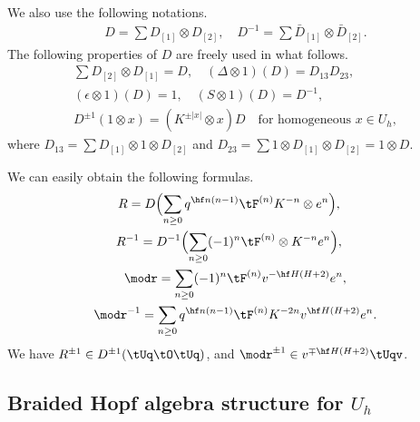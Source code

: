 \documentclass{amsart}
\numberwithin{equation}{section}
\numberwithin{figure}{section}
\theoremstyle{plain}
\theoremstyle{definition}
\theoremstyle{remark}
\begin{document}
We also use the following notations.
\begin{gather*}
  D = \sum D_{[1]}\otimes D_{[2]},\quad
  D^{-1} = \sum \bar D_{[1]}\otimes \bar D_{[2]}.
\end{gather*}
The following properties of $D$ are freely used in what follows.
\begin{gather}
  \sum D_{[2]}\otimes D_{[1]}=D,\quad
  (\Delta \otimes 1)(D)=D_{13}D_{23},\\
  (\epsilon \otimes 1)(D)=1,\quad
  (S\otimes 1)(D)=D^{-1},\\
  \label{e31}
  D^{\pm 1}(1\otimes x)=(K^{\pm |x|}\otimes x)D\quad \text{for homogeneous $x\in U_h$},
\end{gather}
where $D_{13}=\sum D_{[1]}\otimes 1\otimes D_{[2]}$ and
$D_{23}=\sum1\otimes D_{[1]}\otimes D_{[2]}=1\otimes D$.

We can easily obtain the following formulas.
\begin{gather}
  \label{eq:11}
  \begin{split}
  R
  &=D\Bigl(\sum_{n\ge 0} q^{\hf n(n-1)}\tF^{(n)}K^{-n}\otimes e^n\Bigr),
  \end{split}\\
  \label{e30}
  \begin{split}
    R^{-1}
    &=D^{-1}\Bigl(\sum_{n\ge 0} (-1)^n\tF^{(n)}\otimes K^{-n}e^n\Bigr),
  \end{split}\\
  \label{eq:65}
  \modr =\sum_{n\ge 0}(-1)^n\tF^{(n)}v^{-\hf H(H+2)}e^n,\\
  \label{eq:66}
  \modr ^{-1}=\sum_{n\ge 0}q^{\hf n(n-1)}
  \tF^{(n)}K^{-2n}v^{\hf H(H+2)}e^n.
\end{gather}
We have
$R^{\pm 1}\in D^{\pm 1}(\tUq\tO\tUq)$, and $\modr ^{\pm 1}\in v^{\mp\hf H(H+2)}\tUqv$.

\subsection{Braided Hopf algebra structure for $U_h$}
\label{sec:transmutation}
\end{document}
